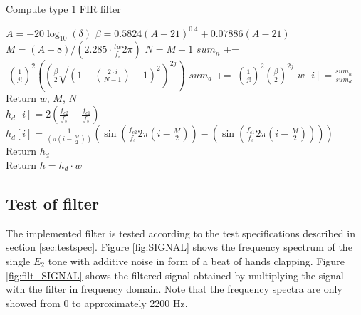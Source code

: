 \begin{algorithm}[H]
\caption{Compute type 1 FIR filter}
\label{alg:FIR}
\begin{algorithmic}[1] 
\State $A=-20\log_{10}(\delta)$ 
\State $\beta = 0.5824(A-21)^{0.4} + 0.07886(A-21)$ 
\State $M = (A-8)/(2.285 \cdot \frac{tw}{f_s} 2\pi)$ 
\State $N = M+1$ 
			\State $ sum_n$ += $ \ (\frac{1}{j!})^2 \left( \left( \frac{\beta}{2} \sqrt{\left(1 - \left( \frac{2 \cdot i}{N-1}\right) - 1\right)^2}\right)^{2j}\right)$
			\State $ sum_d$ += $\ (\frac{1}{j!})^2 \left( \frac{\beta}{2}\right)^{2j}$
		\EndFor
		\State $w[i]=\frac{sum_n}{sum_d}$
	\EndFor
	\State Return $w$, $M$, $N$
\EndProcedure
\\
        		\State $h_d[i] = 2( \frac{f_{c2}}{f_s} - \frac{f_{c1}}{f_s})$
        	\Else 
        		\State  $h_d[i] = \frac{1}{ (\pi (i - \frac{M}{2}))}(\sin(\frac{f_{c2}}{f_s} 2 \pi (i - \frac{M}{2})) - (\sin(\frac{f_{c1}}{f_s} 2 \pi (i - \frac{M}{2}))))$ 
          	\EndIf 
  	\EndFor
  	\State Return $h_d$
\EndProcedure
\\
	\State Return $h = h_d \cdot w$ 
\EndProcedure


\end{algorithmic}
\end{algorithm}

\subsection{Test of filter}
The implemented filter is tested according to the test specifications described in section \ref{sec:testspec}. Figure \ref{fig:SIGNAL} shows the frequency spectrum of the single $E_2$ tone with additive noise in form of a beat of hands clapping. Figure \ref{fig:filt_SIGNAL} shows the filtered signal obtained by multiplying the signal with the filter in frequency domain. Note that the frequency spectra are only showed from 0 to approximately 2200 Hz.  

